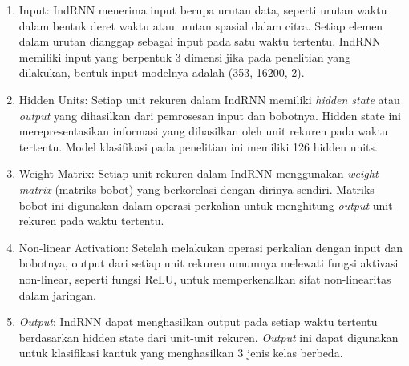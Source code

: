 \begin{enumerate}[nolistsep]
      \item Input: IndRNN menerima input berupa urutan data, seperti urutan waktu dalam bentuk deret waktu atau urutan spasial dalam citra.
            Setiap elemen dalam urutan dianggap sebagai input pada satu waktu tertentu. IndRNN memiliki input yang berpentuk 3 dimensi jika
            pada penelitian yang dilakukan, bentuk input modelnya adalah (353, 16200, 2).

      \item Hidden Units: Setiap unit rekuren dalam IndRNN memiliki \emph{hidden state} atau \emph{output} yang dihasilkan dari pemrosesan input dan
            bobotnya. Hidden state ini merepresentasikan informasi yang dihasilkan oleh unit rekuren pada waktu tertentu. Model klasifikasi
            pada penelitian ini memiliki 126 hidden units.

      \item Weight Matrix: Setiap unit rekuren dalam IndRNN menggunakan \emph{weight matrix} (matriks bobot) yang berkorelasi dengan dirinya sendiri.
            Matriks bobot ini digunakan dalam operasi perkalian untuk menghitung \emph{output} unit rekuren pada waktu tertentu.

      \item Non-linear Activation: Setelah melakukan operasi perkalian dengan input dan bobotnya, output dari setiap unit rekuren umumnya
            melewati fungsi aktivasi non-linear, seperti fungsi ReLU, untuk memperkenalkan sifat non-linearitas dalam jaringan.

      \item \emph{Output}: IndRNN dapat menghasilkan output pada setiap waktu tertentu berdasarkan hidden state dari unit-unit rekuren. \emph{Output} ini
            dapat digunakan untuk klasifikasi kantuk yang menghasilkan 3 jenis kelas berbeda.

\end{enumerate}

